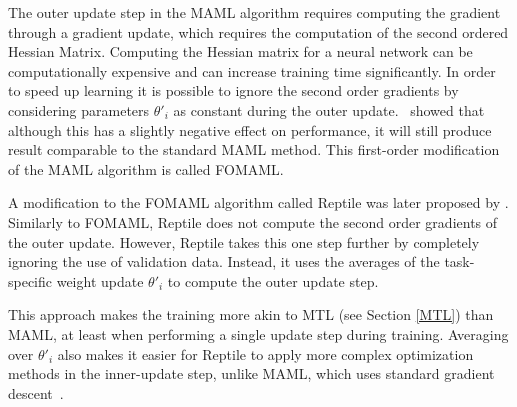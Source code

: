 The outer update step in the \gls{MAML} algorithm requires computing the gradient through a gradient update, which requires the computation of the second ordered Hessian Matrix. Computing the Hessian matrix for a neural network can be computationally expensive and can increase training time significantly. In order to speed up learning it is possible to ignore the second order gradients by considering parameters $\theta'_i$ as constant during the outer update.~\textcite{maml} showed that although this has a slightly negative effect on performance, it will still produce result comparable to the standard \gls{MAML} method. This first-order modification of the \gls{MAML} algorithm is called \gls{FOMAML}.

A modification to the \gls{FOMAML} algorithm called Reptile was later proposed by \textcite{reptile}. Similarly to \gls{FOMAML}, Reptile does not compute the second order gradients of the outer update. However, Reptile takes this one step further by completely ignoring the use of validation data. Instead, it uses the averages of the task-specific weight update $\theta'_i$ to compute the outer update step. 

This approach makes the training more akin to \gls{MTL} (see Section \ref{MTL}) than \gls{MAML}, at least when performing a single update step during training. Averaging over $\theta'_i$  also makes it easier for Reptile to apply more complex optimization methods in the inner-update step, unlike \gls{MAML}, which uses standard gradient descent~\cite{reptile}.



